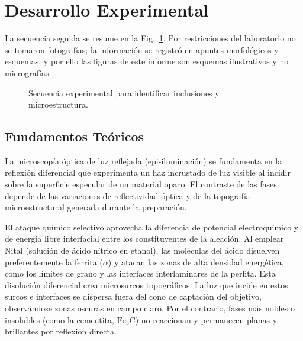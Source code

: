 \documentclass[journal,11pt]{IEEEtran}
\newcommand{\FeFeC}{Fe--Fe$_3$C}
\begin{document}
\section{Desarrollo Experimental}
La secuencia seguida se resume en la Fig.~\ref{fig:diagrama_flujo}. Por restricciones del laboratorio no se tomaron fotografías; la información se registró en apuntes morfológicos y esquemas, y por ello las figuras de este informe son esquemas ilustrativos y no micrografías.

\begin{figure}[!t]
\centering
{}
\caption{Secuencia experimental para identificar inclusiones y microestructura.}
\label{fig:diagrama_flujo}
\end{figure}

\subsection{Fundamentos Teóricos}
La microscopía óptica de luz reflejada (epi-iluminación) se fundamenta en la reflexión diferencial que experimenta un haz incrustado de luz visible al incidir sobre la superficie especular de un material opaco. El contraste de las fases depende de las variaciones de reflectividad óptica y de la topografía microestructural generada durante la preparación.

El ataque químico selectivo aprovecha la diferencia de potencial electroquímico y de energía libre interfacial entre los constituyentes de la aleación. Al emplear Nital (solución de ácido nítrico en etanol), las moléculas del ácido disuelven preferentemente la ferrita ($\alpha$) y atacan las zonas de alta densidad energética, como los límites de grano y las interfaces interlaminares de la perlita. Esta disolución diferencial crea microsurcos topográficos. La luz que incide en estos surcos e interfaces se dispersa fuera del cono de captación del objetivo, observándose zonas oscuras en campo claro. Por el contrario, fases más nobles o insolubles (como la cementita, $\mathrm{Fe_3C}$) no reaccionan y permanecen planas y brillantes por reflexión directa.
\end{document}

